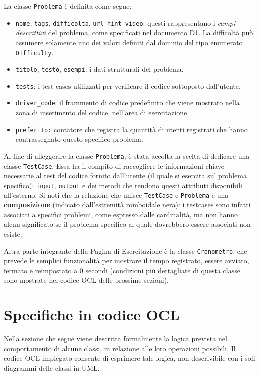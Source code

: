 \documentclass[11pt, a4paper]{article}
\theoremstyle{definition} %
\begin{document}
\noindent La classe \texttt{Problema} è definita come segue:
\begin{itemize}
    \item \texttt{nome}, \texttt{tags}, \texttt{difficolta}, \texttt{url\_hint\_video}:
    questi rappresentano i \textit{campi descrittivi} del problema, come specificati nel
    documento D1. La difficoltà può assumere solamente uno dei valori
    definiti dal dominio del tipo enumerato \texttt{Difficulty}.

    \item \texttt{titolo}, \texttt{testo}, \texttt{esempi}: i dati strutturali del problema.

    \item \texttt{tests}: i test cases utilizzati per verificare il codice
    sottoposto dall'utente.

    \item \texttt{driver\_code}: il frammento di codice predefinito che
    viene mostrato nella zona di inserimento del codice, nell'area di
    esercitazione.

    \item \texttt{preferito:} contatore che registra la quantità di utenti
    registrati che hanno contrassegnato questo specifico problema.
\end{itemize}
Al fine di alleggerire la classe \texttt{Problema}, è stata accolta la scelta di
dedicare una classe \texttt{TestCase}. Essa ha il compito di raccogliere le informazioni
chiave necessarie al test del codice fornito dall'utente (il quale si esercita
sul problema specifico): \texttt{input}, \texttt{output} e dei metodi che rendono
questi attributi disponibili all'esterno.
Si noti che la relazione che unisce \texttt{TestCase} e \texttt{Problema} è
una \textbf{composizione} (indicato dall'estremità romboidale nera): i testcases
sono infatti associati a specifici problemi, come espresso dalle cardinalità,
ma non hanno alcun significato se il problema specifico al quale dovrebbero
essere associati non esiste.

Altra parte integrante della Pagina di Esercitazione è la classe \texttt{Cronometro},
che prevede le semplici funzionalità per mostrare il tempo registrato,
essere avviato, fermato e reimpostato a 0 secondi (condizioni più dettagliate
di questa classe sono mostrate nel codice OCL delle prossime sezioni).



\newpage
\section{Specifiche in codice OCL}
Nella sezione che segue viene descritta formalmente la logica prevista
nel comportamento di alcune classi, in relazione alle loro operazioni
possibili. Il codice OCL impiegato consente di esprimere tale logica,
non descrivibile con i soli diagrammi delle classi in UML.
\end{document}
